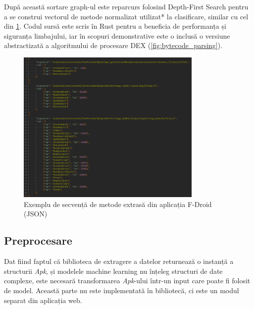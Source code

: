 \documentclass[12pt,a4paper]{report}
\begin{document}
După această sortare graph-ul este reparcurs folosind Depth-First Search\cite{depth-first-search}
pentru a se construi vectorul de metode normalizat utilizat* la clasificare, similar cu cel din \cref{fig:f-droid-json}.
Codul sursă este scris în Rust pentru a beneficia de performanța și siguranța limbajului,
iar în scopuri demonstrative este o inclusă o versiune abstractizată a algoritmului de procesare DEX (\cref{fig:bytecode_parsing}).
\begin{figure}[H]
      \centering
      \includegraphics[width=0.8\textwidth]{visuals/methods_json.png}
      \caption{Exemplu de secvență de metode extrasă din aplicația F-Droid\cite{f-droid} (JSON)}
      \label{fig:f-droid-json}
\end{figure}

\subsection{Preprocesare}
Dat fiind faptul că biblioteca de extragere a datelor returnează o instanță a structurii \textit{Apk},
și modelele machine learning nu înțeleg structuri de date complexe,
este necesară transformarea \textit{Apk}-ului într-un input care poate fi folosit de model.
Această parte nu este implementată în bibliotecă, ci este un modul separat din aplicația web.
\end{document}
